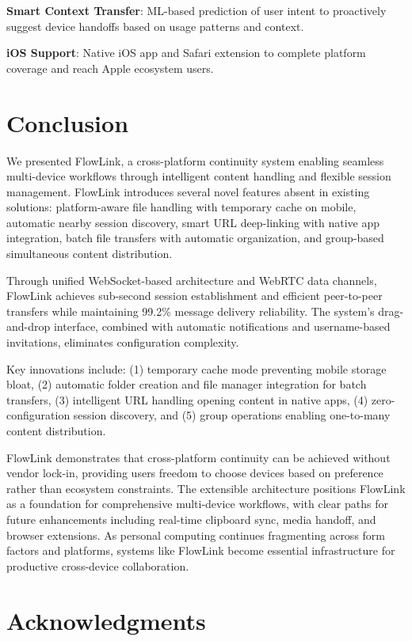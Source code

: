 \documentclass[conference]{IEEEtran}
\begin{document}
\textbf{Smart Context Transfer}: ML-based prediction of user intent to proactively suggest device handoffs based on usage patterns and context.

\textbf{iOS Support}: Native iOS app and Safari extension to complete platform coverage and reach Apple ecosystem users.

\section{Conclusion}

We presented FlowLink, a cross-platform continuity system enabling seamless multi-device workflows through intelligent content handling and flexible session management. FlowLink introduces several novel features absent in existing solutions: platform-aware file handling with temporary cache on mobile, automatic nearby session discovery, smart URL deep-linking with native app integration, batch file transfers with automatic organization, and group-based simultaneous content distribution.

Through unified WebSocket-based architecture and WebRTC data channels, FlowLink achieves sub-second session establishment and efficient peer-to-peer transfers while maintaining 99.2\% message delivery reliability. The system's drag-and-drop interface, combined with automatic notifications and username-based invitations, eliminates configuration complexity.

Key innovations include: (1) temporary cache mode preventing mobile storage bloat, (2) automatic folder creation and file manager integration for batch transfers, (3) intelligent URL handling opening content in native apps, (4) zero-configuration session discovery, and (5) group operations enabling one-to-many content distribution.

FlowLink demonstrates that cross-platform continuity can be achieved without vendor lock-in, providing users freedom to choose devices based on preference rather than ecosystem constraints. The extensible architecture positions FlowLink as a foundation for comprehensive multi-device workflows, with clear paths for future enhancements including real-time clipboard sync, media handoff, and browser extensions. As personal computing continues fragmenting across form factors and platforms, systems like FlowLink become essential infrastructure for productive cross-device collaboration.

\section*{Acknowledgments}
\end{document}
